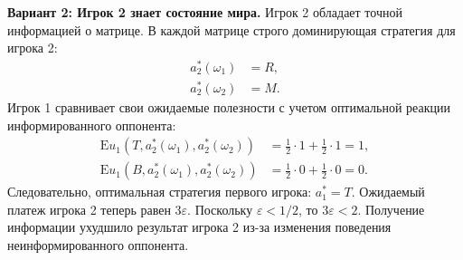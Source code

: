 \begin{example}
\textbf{Вариант 2: Игрок 2 знает состояние мира.}
Игрок 2 обладает точной информацией о матрице. В каждой матрице строго доминирующая стратегия для игрока 2:
\begin{align*}
    a_2^*(\omega_1) &= R, \\
    a_2^*(\omega_2) &= M.
\end{align*}
Игрок 1 сравнивает свои ожидаемые полезности с учетом оптимальной реакции информированного оппонента:
\begin{align*}
    \mathrm{E}u_1(T, a_2^*(\omega_1), a_2^*(\omega_2)) &= \frac{1}{2} \cdot 1 + \frac{1}{2} \cdot 1 = 1, \\
    \mathrm{E}u_1(B, a_2^*(\omega_1), a_2^*(\omega_2)) &= \frac{1}{2} \cdot 0 + \frac{1}{2} \cdot 0 = 0.
\end{align*}
Следовательно, оптимальная стратегия первого игрока: $a_1^* = T$. Ожидаемый платеж игрока 2 теперь равен $3\varepsilon$. Поскольку $\varepsilon < 1/2$, то $3\varepsilon < 2$. Получение информации ухудшило результат игрока 2 из-за изменения поведения неинформированного оппонента.
\end{example}

